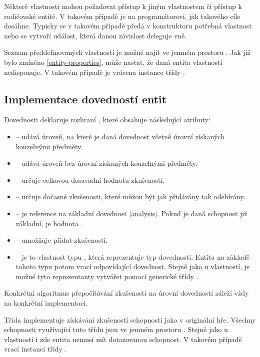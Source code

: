 Některé vlastnosti mohou požadovat přístup k jiným vlastnostem či přístup k rodičovské entitě. V takovém
případě je na programátorovi, jak takového cíle dosáhne. Typicky se v takovém případě předá v konstruktoru
potřebná vlastnost nebo se vytvoří událost, která danou závislost deleguje vně. 

Seznam předdefinovaných vlastností je možné najít ve jemném prostoru .
Jak již bylo zmíněno \vref{entity-properties}, může nastat, že daná entita vlastností nedisponuje. V takovém případě 
je vrácena instance třídy . 

\subsection{Implementace dovedností entit}

Dovednosti deklaruje rozhraní , které obsahuje následující atributy:
\begin{itemize}
\item {} -- udává úroveň, na které je daná dovednost včetně úrovní získaných kouzelnými předměty.
\item {} -- udává úroveň bez úrovní získaných kouzelnými předměty.
\item {}  -- určuje celkovou dosavadní hodnotu zkušeností.
\item {} -- určuje dočasné zkušenosti, které můžou být jak přidávány tak odebírány.
\item {} -- je reference na základní dovednost \vref{analysis}. Pokud je daná schopnost 
	již základní, je hodnota .
\item {} --  umožňuje přidat zkušenosti.
\item {} -- je to vlastnost typu , která reprezentuje typ dovednosti.  Entita na základě 
	tohoto typu potom vrací odpovídající dovednost. Stejně jako u vlastností, je možné tyto reprezentanty vytvářet pomocí generické třídy . 
\end{itemize}

Konkrétní algoritmus přepočítávání zkušeností na úrovní dovedností záleží vždy na konkrétní implementaci.  

Třída  implementuje získávání zkušeností schopností jako v originální hře. Všechny schopnosti 
využívající tuto třídu jsou ve jemném prostoru . Stejně jako
u vlastností i zde entita nemusí mít dotazovanou schopnost. V takovém případě vrací instanci třídy .

